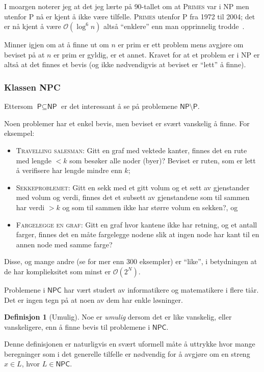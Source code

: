 \documentclass[a4paper, parskip=half]{scrartcl}
\theoremstyle{definition}
\newtheorem{definition}{Definisjon}[section] %
\begin{document}
I moargen noterer jeg at det jeg lærte på 90-tallet om at
\textsc{Primes} var i \textsf{NP} men utenfor \textsf{P} nå er kjent å
ikke være tilfelle.  \textsc{Primes} utenfor \textsf{P} fra 1972 til
2004; det er nå kjent å være $\mathcal{O}({\log}^6 n)$ altså
``enklere'' enn man opprinnelig trodde~\cite{Agrawal2004}.

Minner igjen om at å finne ut om $n$ er prim er ett problem mens
avgjøre om beviset på at $n$ er prim er gyldig, er et annet. Kravet
for at et problem er i \textsf{NP} er altså at det finnes et bevis (og
ikke nødvendigvis at beviset er ``lett'' å finne). 


%
\subsubsection{Klassen \textsf{NPC}}
Ettersom $\textsf{P} \subseteq \textsf{NP}$ er det interessant å se på
problemene $\textsf{NP} \setminus \textsf{P}$.

Noen problemer har et enkel bevis, men beviset er svært vanskelig
å finne.  For eksempel:
\begin{itemize}
\item \textsc{Travelling salesman}: Gitt en graf med vektede kanter,
  finnes det en rute med lengde $<k$ som besøker alle noder (byer)?
  Beviset er ruten, som er lett å verifisere har lengde mindre enn
  $k$;
\item \textsc{Sekkeproblemet}: Gitt en sekk med et gitt volum og et
  sett av gjenstander med volum og verdi, finnes det et subsett av
  gjenstandene som til sammen har verdi $>k$ og som til sammen ikke
  har større volum en sekken?, og 
\item \textsc{Fargelegge en graf}: Gitt en graf hvor kantene ikke
    har retning, og et antall farger, finnes det en måte fargelegge
    nodene slik at ingen node har kant til en annen node med samme farge?
\end{itemize}
%
Disse, og mange andre (se\cite{GareyJohnson1979} for mer enn 300
eksempler) er ``like'', i betydningen at de har komplieksitet som
minst er $\mathcal{O}(2^N)$.

Problemene i $\textsf{NPC}$ har vært studert av informatikere og
matematikere i flere tiår.  Det er ingen tegn på at noen av dem har
enkle løsninger.

\begin{definition}[Umulig]
  Noe er \emph{umulig} dersom det er like vanskelig, eller
  vanskeligere, enn å finne bevis til problemene i $\textsf{NPC}$.
\end{definition}
%
Denne definisjonen er naturligvis en svært uformell måte å uttrykke
hvor mange beregninger som i det generelle tilfelle er nødvendig for å
avgjøre om en streng $x \in L$, hvor $L \in \textsf{NPC}$.
\end{document}
